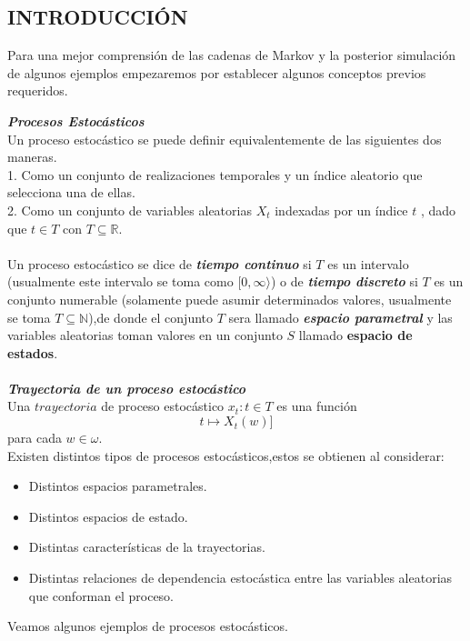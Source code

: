 \documentclass[10pt,a4paper]{article}
\theoremstyle{definition}
\theoremstyle{remark}
\begin{document}
\begin{multicols}{2}
\begin{center}
\section{INTRODUCCIÓN}
\end{center}
Para una mejor comprensión de las cadenas de Markov y la posterior simulación de algunos ejemplos empezaremos por establecer algunos conceptos previos requeridos.

\textbf{\textit{Procesos Estocásticos}}\\
Un proceso estocástico se puede definir equivalentemente de las siguientes dos maneras.\\
1. Como un conjunto de realizaciones temporales y un índice aleatorio que selecciona una 
de ellas.\\
2. Como un conjunto de variables aleatorias $X_{t}$ indexadas por un índice $t$ , dado que $t \in T$ con $T\subseteq \mathbb{R} $.\\\\
Un proceso estocástico se dice de \textbf{\textit{tiempo continuo}} si $T$ es un intervalo (usualmente este intervalo se toma como $[0,\infty\rangle$) o de \textbf{\textit{tiempo discreto}} si $T$ es un conjunto numerable (solamente puede asumir determinados valores, usualmente se toma $T 
\subseteq \mathbb{N}$),de donde el conjunto $T$ sera llamado \textbf{\textit{espacio 
parametral}} y las variables aleatorias toman valores en un conjunto $S$ llamado 
\textbf{espacio de estados}.\\
\\
\textbf{\textit{Trayectoria de un proceso estocástico}}\\
Una $trayectoria$ de proceso estocástico $x_{t}: t \in T$ es una función $$t 
\longmapsto X_{t}(w)]$$ para cada $w \in \omega.$\\
Existen distintos tipos de procesos estocásticos,estos se obtienen al considerar:
\begin{itemize}
	\item Distintos espacios parametrales.
	\item Distintos espacios de estado.
	\item Distintas características de la trayectorias.
	\item Distintas relaciones de dependencia estocástica entre las variables aleatorias 
	que conforman el proceso.
\end{itemize}
Veamos algunos ejemplos de procesos estocásticos.

\end{multicols}
\end{document}
